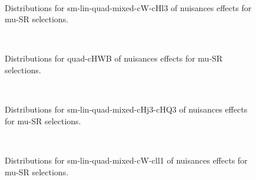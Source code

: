 \begin{figure}[htbp]  
\centering 
\\ 
\caption{ 
   Distributions for sm-lin-quad-mixed-cW-cHl3 of nuisances effects for mu-SR selections.
} 
\label{fig:sm_lin_quad_mixed_cW_cHl3_mu_SR} 
\end{figure} 




\begin{figure}[htbp]  
\centering 
\\ 
\caption{ 
   Distributions for quad-cHWB of nuisances effects for mu-SR selections.
} 
\label{fig:quad_cHWB_mu_SR} 
\end{figure} 




\begin{figure}[htbp]  
\centering 
\\ 
\caption{ 
   Distributions for sm-lin-quad-mixed-cHj3-cHQ3 of nuisances effects for mu-SR selections.
} 
\label{fig:sm_lin_quad_mixed_cHj3_cHQ3_mu_SR} 
\end{figure} 




\begin{figure}[htbp]  
\centering 
\\ 
\caption{ 
   Distributions for sm-lin-quad-mixed-cW-cll1 of nuisances effects for mu-SR selections.
} 
\label{fig:sm_lin_quad_mixed_cW_cll1_mu_SR} 
\end{figure} 


